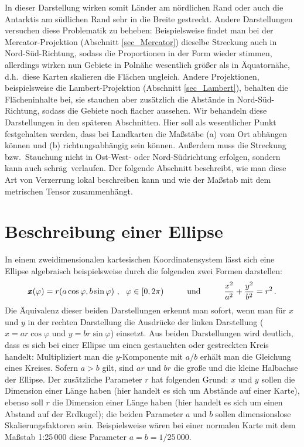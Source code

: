 In dieser Darstellung wirken somit L\"ander am n\"ordlichen Rand oder auch
die Antarktis am s\"udlichen Rand sehr in die Breite gestreckt. Andere Darstellungen versuchen
diese Problematik zu beheben: Beispielsweise findet man bei der 
Mercator-Projektion (Abschnitt \ref{sec_Mercator}) 
dieselbe Streckung auch in Nord-S\"ud-Richtung, sodass die Proportionen in der Form wieder stimmen,
allerdings wirken nun Gebiete in Poln\"ahe wesentlich gr\"o\ss er als in \"Aquatorn\"ahe, d.h.\ diese
Karten skalieren die Fl\"achen ungleich. Andere Projektionen, beispielsweise die 
Lambert-Projektion (Abschnitt \ref{sec_Lambert}),
behalten die Fl\"acheninhalte bei, sie stauchen aber zus\"atzlich die Abst\"ande  in Nord-S\"ud-Richtung,
sodass die Gebiete noch flacher aussehen. Wir behandeln diese Darstellungen in den
sp\"ateren Abschnitten. Hier soll als wesentlicher Punkt festgehalten werden, dass bei Landkarten
die Ma\ss st\"abe (a) vom Ort abh\"angen k\"onnen und (b) richtungsabh\"angig sein k\"onnen. 
Au\ss erdem muss die Streckung bzw.\ Stauchung nicht in Ost-West- oder Nord-S\"udrichtung erfolgen,
sondern kann auch \glqq schr\"ag\grqq\ verlaufen. Der folgende Abschnitt beschreibt, wie man
diese Art von Verzerrung lokal beschreiben kann und wie der Ma\ss stab mit dem metrischen
Tensor zusammenh\"angt. 

\section{Beschreibung einer Ellipse} 

In einem zweidimensionalen kartesischen
Koordinatensystem l\"asst sich eine Ellipse algebraisch beispielsweise durch die folgenden
zwei Formen darstellen:
\begin{equation}
\label{eq_Ellipse1}
            \pmb{x}(\varphi) = r (a \cos \varphi, b \sin \varphi) ~,~~  \varphi \in [0,2\pi)
            \hspace{1cm} {\rm und} \hspace{1cm}
             \frac{x^2}{a^2} + \frac{y^2}{b^2} = r^2 \, .
\end{equation}
Die \"Aquivalenz dieser beiden Darstellungen erkennt man sofort, wenn man f\"ur $x$ und $y$ in
der rechten Darstellung die Ausdr\"ucke der linken Darstellung ($x=ar\cos \varphi$ und $y=br\sin \varphi$)
einsetzt. Aus beiden Darstellungen wird deutlich, dass es sich bei einer Ellipse um einen
gestauchten oder gestreckten Kreis handelt: Multipliziert man die $y$-Komponente mit $a/b$ erh\"alt
man die Gleichung eines Kreises. Sofern $a>b$ gilt, sind $ar$ und $br$ die gro\ss e und die kleine 
Halbachse der Ellipse. Der zus\"atzliche Parameter $r$ hat folgenden Grund:
$x$ und $y$ sollen die Dimension einer L\"ange haben (hier handelt es sich um Abst\"ande auf
einer Karte), ebenso soll $r$ die Dimension einer L\"ange haben (hier handelt es sich um einen
Abstand auf der Erdkugel); die beiden Parameter $a$ und $b$ sollen dimensionslose
Skalierungsfaktoren sein. Beispielsweise w\"aren bei einer normalen Karte mit dem
Ma\ss stab 1:25\,000 diese Parameter $a=b=1/25\,000$. 

